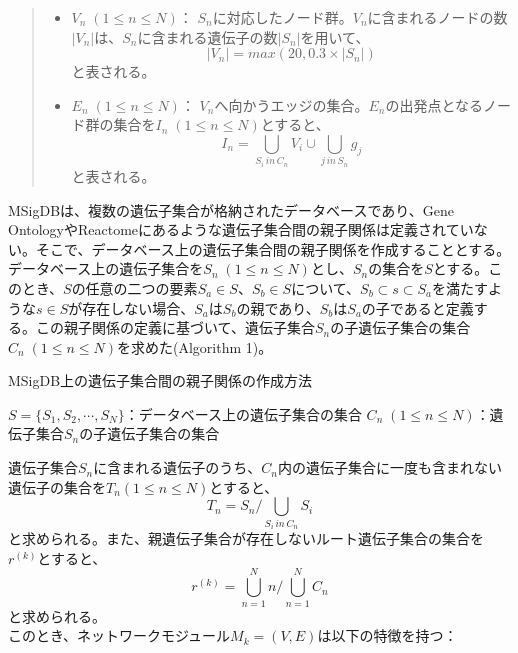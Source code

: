 \documentclass[a4paper,12pt]{jsreport}
\begin{document}
  \begin{quote}
  \begin{itemize}
  \item $V_n \; (1\leq n\leq N)$： $S_n$に対応したノード群。$V_n$に含まれるノードの数$|V_n|$は、$S_n$に含まれる遺伝子の数$|S_n|$を用いて、$$|V_n| = max(20, 0.3 \times |S_n|)$$と表される。
  \item $E_n \; (1\leq n\leq N)$： $V_n$へ向かうエッジの集合。$E_n$の出発点となるノード群の集合を$I_n \; (1\leq n\leq N)$とすると、$$I_n =  \bigcup_{S_i\, in\, C_n}V_i \cup \bigcup_{j\, in\, S_n} g_j$$と表される。
  \end{itemize}
  \end{quote}




 MSigDBは、複数の遺伝子集合が格納されたデータベースであり、Gene OntologyやReactomeにあるような遺伝子集合間の親子関係は定義されていない。そこで、データベース上の遺伝子集合間の親子関係を作成することとする。データベース上の遺伝子集合を$S_n \; (1\leq n\leq N)$とし、$S_n$の集合を$S$とする。このとき、$S$の任意の二つの要素$S_a \in S$、$S_b \in S$について、$S_{b} \subset s \subset S_a$を満たすような$s \in S$が存在しない場合、$S_a$は$S_b$の親であり、$S_b$は$S_a$の子であると定義する。この親子関係の定義に基づいて、遺伝子集合$S_n$の子遺伝子集合の集合$C_n \; (1\leq n\leq N)$を求めた(Algorithm 1)。
 
 \begin{algorithm}[H]
 \caption{MSigDB上の遺伝子集合間の親子関係の作成方法}
 \begin{algorithmic}[1]
 \renewcommand{\algorithmicrequire}{\textbf{Input:}}
 \renewcommand{\algorithmicensure}{\textbf{Output:}}
 \REQUIRE $S = \{S_1, S_2, \cdots, S_N\}$：データベース上の遺伝子集合の集合
 \ENSURE  $C_n \; (1\leq n\leq N)$：遺伝子集合$S_n$の子遺伝子集合の集合
 \ENDIF
 \ENDFOR
 \ENDFOR
 \end{algorithmic} 
 \end{algorithm}

遺伝子集合$S_n$に含まれる遺伝子のうち、$C_n$内の遺伝子集合に一度も含まれない遺伝子の集合を$T_n(1\leq n\leq N)$とすると、
　$$T_n = S_n / \bigcup_{S_i\, in\, C_n} \! S_i$$
と求められる。また、親遺伝子集合が存在しないルート遺伝子集合の集合を$r^{(k)}$とすると、$$r^{(k)} = \bigcup_{n = 1}^{N}n / \bigcup_{n = 1}^{N} C_n$$と求められる。\\
このとき、ネットワークモジュール$M_k = (V, E)$は以下の特徴を持つ：
\end{document}
